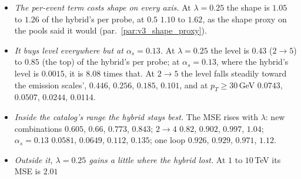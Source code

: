 \documentclass[11pt]{article}
\begin{document}
\begin{itemize}
  \item \emph{The per-event term costs shape on every axis.} At $\lambda=0.25$ the shape is $1.05$ to $1.26$ of the
    hybrid's per probe, at $0.5$ $1.10$ to $1.62$, as the shape proxy on the pools said it would (par.~\ref{par:v3_shape_proxy}).
  \item \emph{It buys level everywhere but at $\alpha_s=0.13$.} At $\lambda=0.25$ the level is $0.43$ ($2\to5$) to
    $0.85$ (the top) of the hybrid's per probe; at $\alpha_s=0.13$, where the hybrid's level is $0.0015$, it is
    $8.08$ times that. At $2\to5$ the level falls steadily toward the emission scales', $0.446$, $0.256$, $0.185$,
    $0.101$, and at $p_T\geq30$\,GeV $0.0743$, $0.0507$, $0.0244$, $0.0114$.
  \item \emph{Inside the catalog's range the hybrid stays best.} The MSE rises with $\lambda$: new combinations
    $0.605$, $0.66$, $0.773$, $0.843$; $2\to4$ $0.82$, $0.902$, $0.997$, $1.04$; $\alpha_s=0.13$ $0.0581$, $0.0649$,
    $0.112$, $0.135$; one loop $0.926$, $0.929$, $0.971$, $1.12$.
  \item \emph{Outside it, $\lambda=0.25$ gains a little where the hybrid lost.} At $1$ to $10$\,TeV its MSE is $2.01$

\end{itemize}
\end{document}
